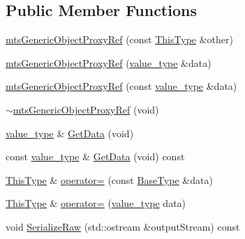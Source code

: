 \subsection*{Public Member Functions}
\begin{DoxyCompactItemize}
\item 
\hyperlink{classmts_generic_object_proxy_ref_a9af6769b331671ed85bd5ca64b020446}{mts\-Generic\-Object\-Proxy\-Ref} (const \hyperlink{classmts_generic_object_proxy_base_adfa837044848485e7241e56816a74083}{This\-Type} \&other)
\item 
\hyperlink{classmts_generic_object_proxy_ref_ac9c91c48ed674fc2c2466ac409ece49e}{mts\-Generic\-Object\-Proxy\-Ref} (\hyperlink{classmts_generic_object_proxy_ref_af50eac4bbf86d9609d7cd77c33d4bf54}{value\-\_\-type} \&data)
\item 
\hyperlink{classmts_generic_object_proxy_ref_add22578ee1c2454fd5635a1c058c1eaf}{mts\-Generic\-Object\-Proxy\-Ref} (const \hyperlink{classmts_generic_object_proxy_ref_af50eac4bbf86d9609d7cd77c33d4bf54}{value\-\_\-type} \&data)
\item 
\hyperlink{classmts_generic_object_proxy_ref_a1ccc0a3d068df80341e85e1c3c399fc3}{$\sim$mts\-Generic\-Object\-Proxy\-Ref} (void)
\item 
\hyperlink{classmts_generic_object_proxy_ref_af50eac4bbf86d9609d7cd77c33d4bf54}{value\-\_\-type} \& \hyperlink{classmts_generic_object_proxy_ref_af067553e3178323f5327ad552698135f}{Get\-Data} (void)
\item 
const \hyperlink{classmts_generic_object_proxy_ref_af50eac4bbf86d9609d7cd77c33d4bf54}{value\-\_\-type} \& \hyperlink{classmts_generic_object_proxy_ref_adb9cebfd67fe512f9622343011cec5f7}{Get\-Data} (void) const 
\item 
\hyperlink{classmts_generic_object_proxy_base_adfa837044848485e7241e56816a74083}{This\-Type} \& \hyperlink{classmts_generic_object_proxy_ref_a737d3e414cdad49d8fc32397644d545a}{operator=} (const \hyperlink{classcmn_generic_object}{Base\-Type} \&data)
\item 
\hyperlink{classmts_generic_object_proxy_base_adfa837044848485e7241e56816a74083}{This\-Type} \& \hyperlink{classmts_generic_object_proxy_ref_aa688ddf932da6573a220ee8147e96f6a}{operator=} (\hyperlink{classmts_generic_object_proxy_ref_af50eac4bbf86d9609d7cd77c33d4bf54}{value\-\_\-type} data)
\item 
void \hyperlink{classmts_generic_object_proxy_ref_a7880193bab0e84ddd37374df19eab5ea}{Serialize\-Raw} (std\-::ostream \&output\-Stream) const 
\item 

\end{DoxyCompactItemize}
